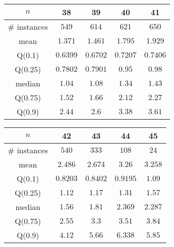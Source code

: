 \begin{tabular}{c|cccc} 
\hline 
$n$ & 38 & 39 & 40 & 41 \tabularnewline 
\hline 
\hline 
\# instances & $549$ & $614$ & $621$ & $650$ \tabularnewline 
mean & $1.371$ & $1.461$ & $1.795$ & $1.929$ \tabularnewline 
Q(0.1) & $0.6399$ & $0.6702$ & $0.7207$ & $0.7406$ \tabularnewline 
Q(0.25) & $0.7802$ & $0.7901$ & $0.95$ & $0.98$ \tabularnewline 
median & $1.04$ & $1.08$ & $1.34$ & $1.43$ \tabularnewline 
Q(0.75) & $1.52$ & $1.66$ & $2.12$ & $2.27$ \tabularnewline 
Q(0.9) & $2.44$ & $2.6$ & $3.38$ & $3.61$ \tabularnewline 
\hline 
\end{tabular} 
\medskip{} 

\begin{tabular}{c|cccc} 
\hline 
$n$ & 42 & 43 & 44 & 45 \tabularnewline 
\hline 
\hline 
\# instances & $540$ & $333$ & $108$ & $24$ \tabularnewline 
mean & $2.486$ & $2.674$ & $3.26$ & $3.258$ \tabularnewline 
Q(0.1) & $0.8203$ & $0.8402$ & $0.9195$ & $1.09$ \tabularnewline 
Q(0.25) & $1.12$ & $1.17$ & $1.31$ & $1.57$ \tabularnewline 
median & $1.56$ & $1.81$ & $2.369$ & $2.287$ \tabularnewline 
Q(0.75) & $2.55$ & $3.3$ & $3.51$ & $3.84$ \tabularnewline 
Q(0.9) & $4.12$ & $5.66$ & $6.338$ & $5.85$ \tabularnewline 
\hline 
\end{tabular} 
\medskip{} 

